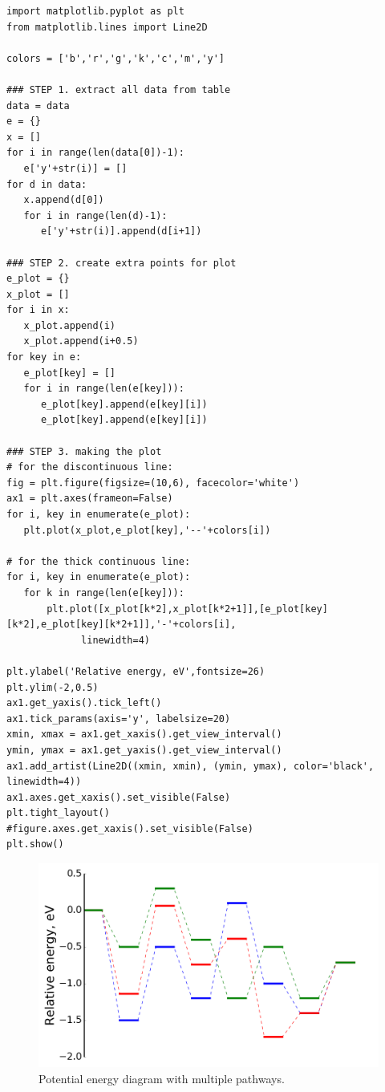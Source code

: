\documentclass[11pt]{article}
\begin{document}
\begin{verbatim}
import matplotlib.pyplot as plt
from matplotlib.lines import Line2D

colors = ['b','r','g','k','c','m','y']

### STEP 1. extract all data from table
data = data
e = {}
x = []
for i in range(len(data[0])-1):
   e['y'+str(i)] = [] 
for d in data:
   x.append(d[0])
   for i in range(len(d)-1):
      e['y'+str(i)].append(d[i+1])

### STEP 2. create extra points for plot
e_plot = {}
x_plot = []
for i in x:
   x_plot.append(i)
   x_plot.append(i+0.5)
for key in e:
   e_plot[key] = []
   for i in range(len(e[key])):
      e_plot[key].append(e[key][i])
      e_plot[key].append(e[key][i])

### STEP 3. making the plot
# for the discontinuous line:
fig = plt.figure(figsize=(10,6), facecolor='white')
ax1 = plt.axes(frameon=False)
for i, key in enumerate(e_plot):
   plt.plot(x_plot,e_plot[key],'--'+colors[i])

# for the thick continuous line:        
for i, key in enumerate(e_plot):
   for k in range(len(e[key])):
       plt.plot([x_plot[k*2],x_plot[k*2+1]],[e_plot[key][k*2],e_plot[key][k*2+1]],'-'+colors[i],
             linewidth=4)

plt.ylabel('Relative energy, eV',fontsize=26)
plt.ylim(-2,0.5)
ax1.get_yaxis().tick_left()
ax1.tick_params(axis='y', labelsize=20)
xmin, xmax = ax1.get_xaxis().get_view_interval()
ymin, ymax = ax1.get_yaxis().get_view_interval()
ax1.add_artist(Line2D((xmin, xmin), (ymin, ymax), color='black', linewidth=4))
ax1.axes.get_xaxis().set_visible(False)
plt.tight_layout()
#figure.axes.get_xaxis().set_visible(False)
plt.show()
\end{verbatim}

\begin{figure}[htbp]
\centering
\includegraphics[width=.9\linewidth]{./figures/PED_multipath.png}
\caption{Potential energy diagram with multiple pathways.}
\end{figure}
\end{document}
